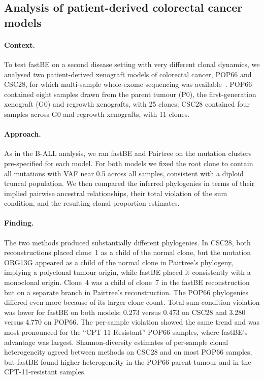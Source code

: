 \documentclass[11pt]{article}
\begin{document}
\subsection{Analysis of patient-derived colorectal cancer models}

\paragraph{Context.}
To test fastBE on a second disease setting with very different clonal dynamics, we analysed two patient-derived xenograft models of colorectal cancer, POP66 and CSC28, for which multi-sample whole-exome sequencing was available~\citep{rehman2021diapause,ulintz2018polyclonal}. POP66 contained eight samples drawn from the parent tumour (P0), the first-generation xenograft (G0) and regrowth xenografts, with 25 clones; CSC28 contained four samples across G0 and regrowth xenografts, with 11 clones.

\paragraph{Approach.}
As in the B-ALL analysis, we ran fastBE and Pairtree on the mutation clusters pre-specified for each model. For both models we fixed the root clone to contain all mutations with VAF near 0.5 across all samples, consistent with a diploid truncal population. We then compared the inferred phylogenies in terms of their implied pairwise ancestral relationships, their total violation of the sum condition, and the resulting clonal-proportion estimates.

\paragraph{Finding.}
The two methods produced substantially different phylogenies. In CSC28, both reconstructions placed clone~1 as a child of the normal clone, but the mutation ORG13G appeared as a child of the normal clone in Pairtree's phylogeny, implying a polyclonal tumour origin, while fastBE placed it consistently with a monoclonal origin. Clone~4 was a child of clone~7 in the fastBE reconstruction but on a separate branch in Pairtree's reconstruction. The POP66 phylogenies differed even more because of its larger clone count. Total sum-condition violation was lower for fastBE on both models: 0.273 versus 0.473 on CSC28 and 3.280 versus 4.770 on POP66. The per-sample violation showed the same trend and was most pronounced for the ``CPT-11 Resistant'' POP66 samples, where fastBE's advantage was largest. Shannon-diversity estimates of per-sample clonal heterogeneity agreed between methods on CSC28 and on most POP66 samples, but fastBE found higher heterogeneity in the POP66 parent tumour and in the CPT-11-resistant samples.
\end{document}
